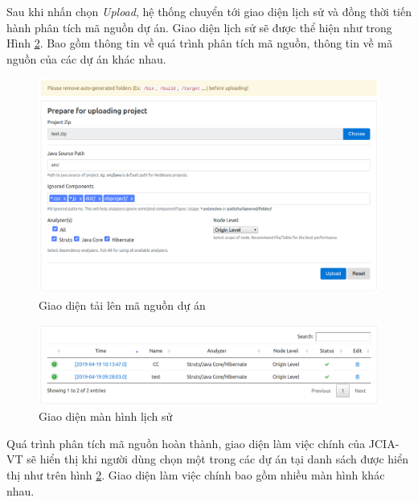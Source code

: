 \documentclass[12pt]{report}
\begin{document}
\noindent Sau khi nhấn chọn \textit{Upload}, hệ thống chuyển tới giao diện lịch sử và đồng thời tiến hành phân tích mã nguồn dự án. Giao diện lịch sử sẽ được thể hiện như trong Hình \ref{fig:history_screen}. Bao gồm thông tin về quá trình phân tích mã nguồn, thông tin về mã nguồn của các dự án khác nhau.
\begin{figure}[h]
	\centering
	\includegraphics[scale=0.4]{images/upload_project}
	\caption{Giao diện tải lên mã nguồn dự án}
	\label{fig:upload_project_source_code}
\end{figure}
\begin{figure}[h]
	\centering
	\includegraphics[scale=0.4]{images/history_screen}
	\caption{Giao diện màn hình lịch sử}
	\label{fig:history_screen}
\end{figure}

\noindent Quá trình phân tích mã nguồn hoàn thành, giao diện làm việc chính của JCIA-VT sẽ hiển thị khi người dùng chọn một trong các dự án tại danh sách được hiển thị như trên hình \ref{fig:history_screen}. Giao diện làm việc chính bao gồm nhiều màn hình khác nhau.
\end{document}
